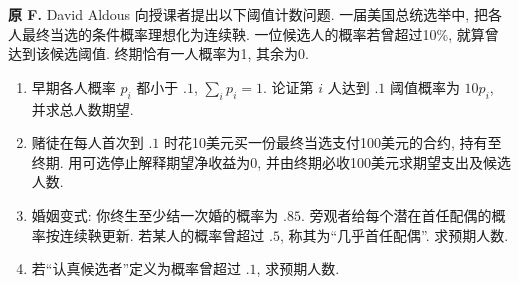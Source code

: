 \begin{exercise}\label{ex:P10.F}
\textbf{原 F.} David Aldous 向授课者提出以下阈值计数问题. 一届美国总统选举中, 把各人最终当选的条件概率理想化为连续鞅. 一位候选人的概率若曾超过10\%, 就算曾达到该候选阈值. 终期恰有一人概率为1, 其余为0.
\begin{enumerate}[label=(\alph*)]
\item\label{part:P10.F.a} 早期各人概率 $p_i$ 都小于 $.1$, $\sum_i p_i=1$. 论证第 $i$ 人达到 $.1$ 阈值概率为 $10p_i$, 并求总人数期望.
\item\label{part:P10.F.b} 赌徒在每人首次到 $.1$ 时花10美元买一份最终当选支付100美元的合约, 持有至终期. 用可选停止解释期望净收益为0, 并由终期必收100美元求期望支出及候选人数.
\item\label{part:P10.F.c} 婚姻变式: 你终生至少结一次婚的概率为 $.85$. 旁观者给每个潜在首任配偶的概率按连续鞅更新. 若某人的概率曾超过 $.5$, 称其为“几乎首任配偶”. 求预期人数.
\item\label{part:P10.F.d} 若“认真候选者”定义为概率曾超过 $.1$, 求预期人数.
\end{enumerate}
\end{exercise}
